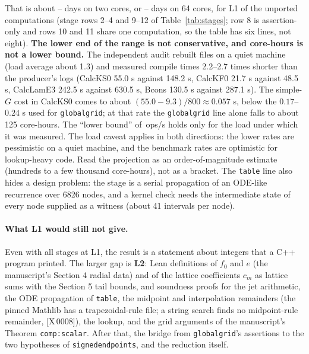 \documentclass[10pt]{article}
\newcommand{\tg}[2]{\texorpdfstring{\textsf{[#1\,#2]}}{}}  %
\newcommand{\lean}[1]{\texttt{#1}}
\renewcommand{\_}{\textunderscore\allowbreak}
\begin{document}
That is about \PTDaysTwoLo--\PTDaysTwoHi{} days on two cores, or \PTDaysSixtyfourLo--\PTDaysSixtyfourHi{} days on 64 cores, for L1 of the unported computations (stage rows 2--4 and 9--12 of Table~\ref{tab:stages}; row 8 is assertion-only and rows 10 and 11 share one computation, so the table has six lines, not eight). \textbf{The lower end of the range is not conservative, and \PTProjTotLo{} core-hours is not a lower bound.} The independent audit rebuilt files on a quiet machine (load average about 1.3) and measured compile times 2.2--2.7 times shorter than the producer's logs (CalcKS0 55.0 s against 148.2 s, CalcKF0 21.7 s against 48.5 s, CalcLamE3 242.5 s against 630.5 s, Bcons 130.5 s against 287.1 s). The simple-$G$ cost in CalcKS0 comes to about $(55.0-9.3)/800\approx0.057$ s, below the $0.17$--$0.24$ s used for \lean{global\_grid}; at that rate the \lean{global\_grid} line alone falls to about 125 core-hours. The ``lower bound'' of \PTRateLow\,ops/s holds only for the load under which it was measured. The load caveat applies in both directions: the lower rates are pessimistic on a quiet machine, and the benchmark rates are optimistic for lookup-heavy code. Read the projection as an order-of-magnitude estimate (hundreds to a few thousand core-hours), not as a bracket. The \lean{table} line also hides a design problem: the stage is a serial propagation of an ODE-like recurrence over 6826 nodes, and a kernel check needs the intermediate state of every node supplied as a witness (about 41 intervals per node).

\paragraph{What L1 would still not give.} Even with all stages at L1, the result is a statement about integers that a C++ program printed. The larger gap is \textbf{L2}: Lean definitions of $f_0$ and $e$ (the manuscript's Section 4 radial data) and of the lattice coefficients $c_m$ as lattice sums with the Section 5 tail bounds, and soundness proofs for the jet arithmetic, the ODE propagation of \lean{table}, the midpoint and interpolation remainders (the pinned Mathlib has a trapezoidal-rule file; a string search finds no midpoint-rule remainder, \tg{X}{0008}), the lookup, and the grid arguments of the manuscript's Theorem \texttt{comp:scalar}. After that, the bridge from \lean{global\_grid}'s assertions to the two hypotheses of \lean{signed\_endpoints}, and the reduction itself.
\end{document}
